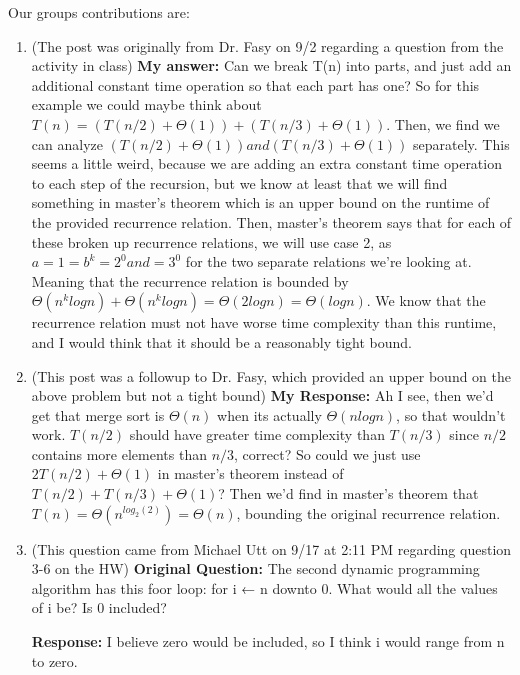 \documentclass{article}
\begin{document}

Our groups contributions are:
\begin{enumerate}
	\item (The post was originally from Dr. Fasy on 9/2 regarding a question from the activity in class)
	    \textbf{My answer:}
	    Can we break T(n) into parts, and just add an additional constant time operation 
		so that each part has one? So for this example we could maybe think about 
		$T(n) = (T(n/2) + \Theta(1)) + (T(n/3) + \Theta(1) )$. Then, we find we 
		can analyze $(T(n/2) + \Theta(1)) and (T(n/3) + \Theta(1))$ separately. 
		This seems a little weird, because we are adding an 
		extra constant time operation to each step of the recursion, 
		but we know at least that we will find something in master's theorem which 
		is an upper bound on the runtime of the provided recurrence relation.
		Then, master's theorem says that for 
		each of these broken up recurrence relations, we will use case 2, as $a = 1 = b^k = 2^0 and = 3^0$ 
		for the two separate relations we're looking at.
		Meaning that the recurrence relation is bounded by $\Theta(n^klogn) + \Theta(n^klogn) 
		= \Theta(2logn) = \Theta(logn)$. We know that the recurrence relation must not
		have worse time complexity than this runtime, and I would think that it should be a reasonably tight bound.

    \item (This post was a followup to Dr. Fasy, which provided an upper bound on the above problem but not a tight bound)
	    \textbf{My Response:}
		Ah I see, then we'd get that merge sort is $\Theta(n)$ when its actually $\Theta(nlogn)$, so that wouldn't work.
		$T(n/2)$ should have greater time complexity than $T(n/3)$ since $n/2$ contains more elements than $n/3$, 
		correct? So could we just use $2T(n/2) + \Theta(1)$ 
		in master's theorem instead of $T(n/2) + T(n/3) + \Theta(1)$?
		Then we'd find in master's theorem that $T(n) = \Theta(n^{log_2(2)}) = \Theta(n)$, 
		bounding the original recurrence relation.
    
    \item (This question came from Michael Utt on 9/17 at 2:11 PM regarding question 3-6 on the HW)
	    \textbf{Original Question:}
	    The second dynamic programming algorithm has this foor loop: for i ← n downto 0.
		What would all the values of i be? Is 0 included?

		\textbf{Response:}
		I believe zero would be included, so I think i would range from n to zero.


\end{enumerate}
\end{document}

